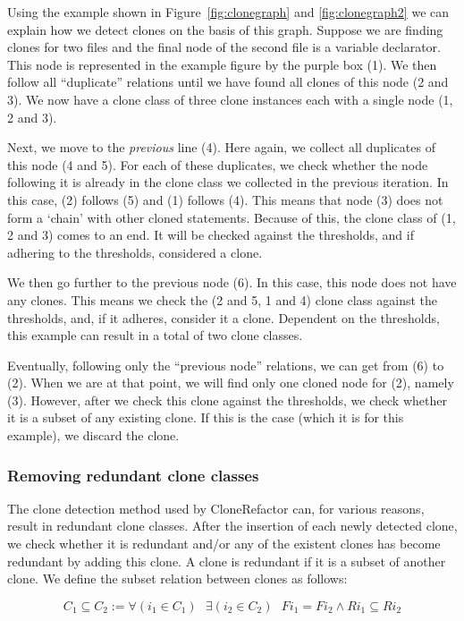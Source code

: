 Using the example shown in Figure~\ref{fig:clonegraph} and \ref{fig:clonegraph2} we can explain how we detect clones on the basis of this graph. Suppose we are finding clones for two files and the final node of the second file is a variable declarator. This node is represented in the example figure by the purple box (1). We then follow all ``duplicate'' relations until we have found all clones of this node (2 and 3). We now have a clone class of three clone instances each with a single node (1, 2 and 3).

Next, we move to the \textit{previous} line (4). Here again, we collect all duplicates of this node (4 and 5). For each of these duplicates, we check whether the node following it is already in the clone class we collected in the previous iteration. In this case, (2) follows (5) and (1) follows (4). This means that node (3) does not form a `chain' with other cloned statements. Because of this, the clone class of (1, 2 and 3) comes to an end. It will be checked against the thresholds, and if adhering to the thresholds, considered a clone.

We then go further to the previous node (6). In this case, this node does not have any clones. This means we check the (2 and 5, 1 and 4) clone class against the thresholds, and, if it adheres, consider it a clone. Dependent on the thresholds, this example can result in a total of two clone classes.

Eventually, following only the ``previous node'' relations, we can get from (6) to (2). When we are at that point, we will find only one cloned node for (2), namely (3). However, after we check this clone against the thresholds, we check whether it is a subset of any existing clone. If this is the case (which it is for this example), we discard the clone.

\subsubsection{Removing redundant clone classes}\label{sec:conceptualremovingredundant}
The clone detection method used by CloneRefactor can, for various reasons, result in redundant clone classes. After the insertion of each newly detected clone, we check whether it is redundant and/or any of the existent clones has become redundant by adding this clone. A clone is redundant if it is a subset of another clone. We define the subset relation between clones as follows:

\begin{equation}\label{eq:subset}
C_1 \subseteq C_2 := \forall (i_1 \in C_1) \text{ } \exists (i_2 \in C_2) \text{ } F i_1 = F i_2 \wedge R i_1 \subseteq R i_2
\end{equation} %


